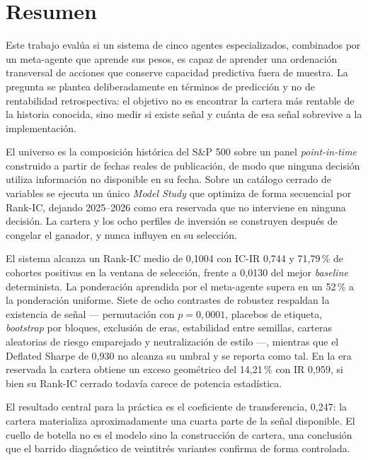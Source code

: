 \chapter*{Resumen}

Este trabajo evalúa si un sistema de cinco agentes especializados, combinados por un meta-agente que
aprende sus pesos, es capaz de aprender una ordenación transversal de acciones que conserve
capacidad predictiva fuera de muestra. La pregunta se plantea deliberadamente en términos de
predicción y no de rentabilidad retrospectiva: el objetivo no es encontrar la cartera más rentable
de la historia conocida, sino medir si existe señal y cuánta de esa señal sobrevive a la
implementación.

El universo es la composición histórica del S\&P 500 sobre un panel \textit{point-in-time}
construido a partir de fechas reales de publicación, de modo que ninguna decisión utiliza
información no disponible en su fecha. Sobre un catálogo cerrado de variables se ejecuta un único
\textit{Model Study} que optimiza de forma secuencial por Rank-IC, dejando 2025--2026 como era
reservada que no interviene en ninguna decisión. La cartera y los ocho perfiles de inversión se
construyen después de congelar el ganador, y nunca influyen en su selección.

El sistema alcanza un Rank-IC medio de 0,1004 con IC-IR 0,744 y 71,79\,\% de cohortes positivas en
la ventana de selección, frente a 0,0130 del mejor \textit{baseline} determinista. La ponderación
aprendida por el meta-agente supera en un 52\,\% a la ponderación uniforme. Siete de ocho contrastes
de robustez respaldan la existencia de señal --- permutación con $p=0{,}0001$, placebos de etiqueta,
\textit{bootstrap} por bloques, exclusión de eras, estabilidad entre semillas, carteras aleatorias
de riesgo emparejado y neutralización de estilo ---, mientras que el Deflated Sharpe de 0,930 no
alcanza su umbral y se reporta como tal. En la era reservada la cartera obtiene un exceso geométrico
del 14,21\,\% con IR 0,959, si bien su Rank-IC cerrado todavía carece de potencia estadística.

El resultado central para la práctica es el coeficiente de transferencia, 0,247: la cartera
materializa aproximadamente una cuarta parte de la señal disponible. El cuello de botella no es el
modelo sino la construcción de cartera, una conclusión que el barrido diagnóstico de veintitrés
variantes confirma de forma controlada.

